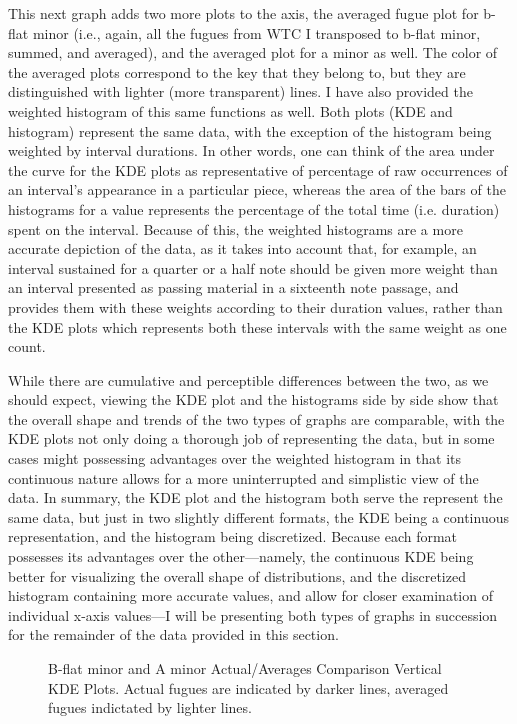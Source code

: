 This next graph adds two more plots to the axis, the averaged fugue plot
for b-flat minor (i.e., again, all the fugues from WTC I transposed to
b-flat minor, summed, and averaged), and the averaged plot for a minor
as well. The color of the averaged plots correspond to the key that they
belong to, but they are distinguished with lighter (more transparent)
lines. I have also provided the weighted histogram of this same
functions as well. Both plots (KDE and histogram) represent the same
data, with the exception of the histogram being weighted by interval
durations. In other words, one can think of the area under the curve for
the KDE plots as representative of percentage of raw occurrences of an
interval's appearance in a particular piece, whereas the area of the
bars of the histograms for a value represents the percentage of the
total time (i.e. duration) spent on the interval. Because of this, the
weighted histograms are a more accurate depiction of the data, as it
takes into account that, for example, an interval sustained for a
quarter or a half note should be given more weight than an interval
presented as passing material in a sixteenth note passage, and provides
them with these weights according to their duration values, rather than
the KDE plots which represents both these intervals with the same weight
as one count.

While there are cumulative and perceptible differences between the two,
as we should expect, viewing the KDE plot and the histograms side by
side show that the overall shape and trends of the two types of graphs
are comparable, with the KDE plots not only doing a thorough job of
representing the data, but in some cases might possessing advantages
over the weighted histogram in that its continuous nature allows for a
more uninterrupted and simplistic view of the data. In summary, the KDE
plot and the histogram both serve the represent the same data, but just
in two slightly different formats, the KDE being a continuous
representation, and the histogram being discretized. Because each format
possesses its advantages over the other---namely, the continuous KDE
being better for visualizing the overall shape of distributions, and the
discretized histogram containing more accurate values, and allow for
closer examination of individual x-axis values---I will be
presenting both types of graphs in succession for the remainder of the
data provided in this section.




\begin{figure}[H]
\vspace{1.5em}
    \centering
    \caption[B-flat minor and a minor Actual/Averages Comparison Vertical KDE Plots. ]{B-flat minor and A minor Actual/Averages Comparison Vertical KDE Plots. Actual fugues are indicated by darker lines, averaged fugues indictated by lighter lines.}
\end{figure}


